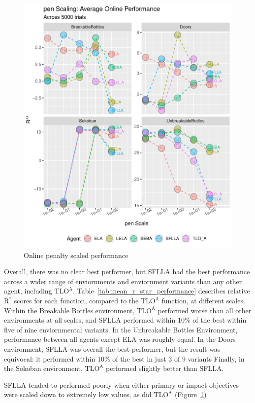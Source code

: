 \begin{figure}[h]
  \includegraphics[width=\columnwidth]{output/onlinepen.pdf}
  \caption{Online penalty scaled performance}
  \label{fig:offline_pen_performance2}
\end{figure}

Overall, there was no clear best performer, but SFLLA had the best performance across a wider range of enviornments and enviornment variants than any other agent, including  $\text{TLO}^\text{A}$. Table~\ref{tab:mean_r_star_performance} describes relative $\text{R}^*$ scores for each function, compared to the $\text{TLO}^\text{A}$ function, at different scales.  Within the Breakable Bottles environment, $\text{TLO}^\text{A}$ performed worse than all other environments at all scales, and SFLLA performed within 10\% of the best within five of nine enviornmental variants. In the Unbreakable Bottles Environment, performance between all agents except ELA was roughly equal. In the Doors environment, SFLLA was overall the best performer, but the result was equivocal: it performed within 10\% of the best in just 3 of 9 variants Finally, in the Sokoban environment, $\text{TLO}^\text{A}$ performed slightly better than SFLLA.

SFLLA tended to performed poorly when either primary or impact objectives were scaled down to extremely low values, as did $\text{TLO}^\text{A}$ (Figure~\ref{fig:offline_pen_performance2})